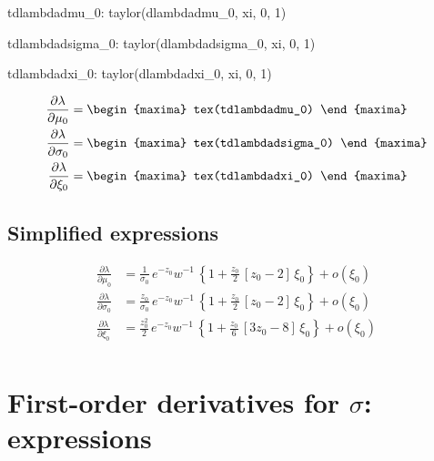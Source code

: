 \begin{maxima}
  tdlambdadmu_0: taylor(dlambdadmu_0, xi, 0, 1)
\end{maxima}
\begin{maxima}
  tdlambdadsigma_0: taylor(dlambdadsigma_0, xi, 0, 1)
\end{maxima}
\begin{maxima}
  tdlambdadxi_0: taylor(dlambdadxi_0, xi, 0, 1)
\end{maxima}

{\color{MonVertF} \footnotesize
\begin{align*}
  \frac{\partial{\lambda}}{\partial \mu_0}
  &=
\begin{maxima}
  tex(tdlambdadmu_0)
\end{maxima}\\
 \frac{\partial{\lambda}}{\partial \sigma_0}
  &=
\begin{maxima}
  tex(tdlambdadsigma_0)
\end{maxima}\\
 \frac{\partial{\lambda}}{\partial \xi_0}
  &=
\begin{maxima}
  tex(tdlambdadxi_0)
\end{maxima}
\end{align*}
}

\subsection*{Simplified expressions}

{\color{red} 
\begin{align*}
  \frac{\partial{\lambda}}{\partial \mu_0}
  &= \frac{1}{\sigma_0} \, e^{-z_0} w^{-1} \,
    \left\{ 1 + \frac{z_0}{2} \,
    \left[z_0 - 2\right] \, \xi_0 \right\} + o(\xi_0)
  \\
 \frac{\partial{\lambda}}{\partial \sigma_0}
  &= \frac{z_0}{\sigma_0} \, e^{-z_0} w^{-1} \,
    \left\{ 1 + \frac{z_0}{2} \,
    \left[z_0 - 2\right] \, \xi_0 \right\} + o(\xi_0)
  \\
 \frac{\partial{\lambda}}{\partial \xi_0}
  &= \frac{z_0^2}{2} \, e^{-z_0} w^{-1} \,
     \left\{ 1 + \frac{z_0}{6} \,
    \left[3 z_0 - 8\right] \, \xi_0 \right\} + o(\xi_0)
  \\
\end{align*}
}

\section{First-order derivatives for $\sigma$: expressions}

